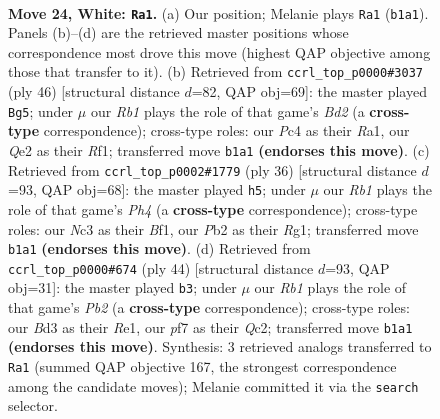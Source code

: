\documentclass[11pt]{article}
\begin{document}
\clearpage

\begin{figure}[p]\centering
\begin{subfigure}{0.46\textwidth}\centering
\resizebox{\linewidth}{!}{%
\newchessgame
\chessboard[
  setfen={r1bq1r1k/2pn1pb1/1p1p1n2/3P3p/p1P5/P1NB2P1/1PN1Q2P/1RB2RK1 w - - 3 24},
  showmover=false,
  pgfstyle=straightmove, color=movearrow, markmove={b1-a1}
]}
\caption{}
\end{subfigure}\hfill
\begin{subfigure}{0.46\textwidth}\centering
\resizebox{\linewidth}{!}{%
\newchessgame
\chessboard[
  setfen={r2q3r/1b1n1ppk/pb3n2/1p2pP1P/4P2P/PNNB3K/1P1BQ3/R4R2 w - - 5 24},
  showmover=false,
  pgfstyle=straightmove, color=movearrow, markmove={d2-g5}
]}
\caption{}
\end{subfigure}
\\[4pt]
\begin{subfigure}{0.46\textwidth}\centering
\resizebox{\linewidth}{!}{%
\newchessgame
\chessboard[
  setfen={2r1k2r/1bqn1ppp/pn2p3/1p1pP1P1/3N3P/bP2BP2/N1PQ4/1K1R1BR1 w k - 0 19},
  showmover=false,
  pgfstyle=straightmove, color=movearrow, markmove={h4-h5}
]}
\caption{}
\end{subfigure}\hfill
\begin{subfigure}{0.46\textwidth}\centering
\resizebox{\linewidth}{!}{%
\newchessgame
\chessboard[
  setfen={r3q1k1/1ppnbrp1/3p1n1p/p2Pp3/P1P4P/2N1B1P1/1PQN1P2/3RR1K1 w - - 5 23},
  showmover=false,
  pgfstyle=straightmove, color=movearrow, markmove={b2-b3}
]}
\caption{}
\end{subfigure}
\caption{\textbf{Move 24, White: \texttt{Ra1}.} (a) Our position; Melanie plays \texttt{Ra1} (\texttt{b1a1}). Panels (b)--(d) are the retrieved master positions whose correspondence most drove this move (highest QAP objective among those that transfer to it). (b) Retrieved from \texttt{ccrl\_top\_p0000\#3037} (ply 46) [structural distance $d$=82, QAP obj=69]: the master played \texttt{Bg5}; under $\mu$ our \emph{Rb1} plays the role of that game's \emph{Bd2} (a \textbf{cross-type} correspondence); cross-type roles: our \emph{P}c4 as their \emph{R}a1, our \emph{Q}e2 as their \emph{R}f1; transferred move \texttt{b1a1} \textbf{(endorses this move)}. (c) Retrieved from \texttt{ccrl\_top\_p0002\#1779} (ply 36) [structural distance $d$=93, QAP obj=68]: the master played \texttt{h5}; under $\mu$ our \emph{Rb1} plays the role of that game's \emph{Ph4} (a \textbf{cross-type} correspondence); cross-type roles: our \emph{N}c3 as their \emph{B}f1, our \emph{P}b2 as their \emph{R}g1; transferred move \texttt{b1a1} \textbf{(endorses this move)}. (d) Retrieved from \texttt{ccrl\_top\_p0000\#674} (ply 44) [structural distance $d$=93, QAP obj=31]: the master played \texttt{b3}; under $\mu$ our \emph{Rb1} plays the role of that game's \emph{Pb2} (a \textbf{cross-type} correspondence); cross-type roles: our \emph{B}d3 as their \emph{R}e1, our \emph{p}f7 as their \emph{Q}c2; transferred move \texttt{b1a1} \textbf{(endorses this move)}. Synthesis: 3 retrieved analogs transferred to \texttt{Ra1} (summed QAP objective 167, the strongest correspondence among the candidate moves); Melanie committed it via the \texttt{search} selector.}

\end{figure}
\end{document}
